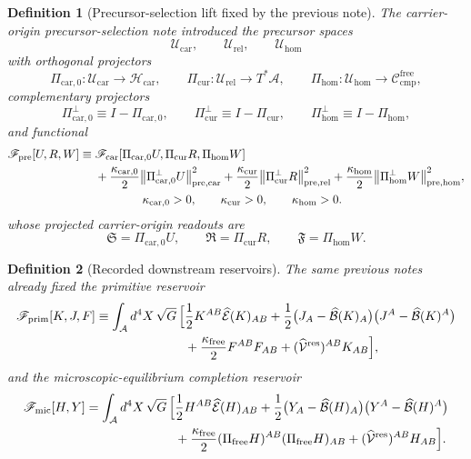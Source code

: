 \documentclass[11pt]{article}
\newcommand{\Sub}{\mathcal A}
\newcommand{\ResidualLift}{\widehat{\mathcal V}^{\mathrm{res}}}
\newcommand{\SubEinLin}{\widehat{\mathcal E}}
\newcommand{\SubGaugeVec}{\widehat{\mathcal B}}
\newcommand{\FreeProj}{\Pi_{\mathrm{free}}}
\newcommand{\GaugeAux}{Y}
\newcommand{\CompFree}{\mathscr C_{\mathrm{cmp}}^{\mathrm{free}}}
\newcommand{\MicFunctional}{\mathscr F_{\mathrm{mic}}}
\newcommand{\PrimFunctional}{\mathscr F_{\mathrm{prim}}}
\newcommand{\CarrierFunctional}{\mathscr F_{\mathrm{car}}}
\newcommand{\PreFunctional}{\mathscr F_{\mathrm{pre}}}
\newcommand{\FreeStiff}{\kappa_{\mathrm{free}}}
\newcommand{\PrimStrain}{K}
\newcommand{\PrimNeutral}{J}
\newcommand{\PrimFree}{F}
\newcommand{\CarrierClass}{\mathscr H_{\mathrm{car}}}
\newcommand{\CarrierSeed}{\mathfrak S}
\newcommand{\RelabelSeed}{\mathfrak R}
\newcommand{\FreeSeed}{\mathfrak F}
\newcommand{\PreTensorClass}{\mathscr U_{\mathrm{car}}}
\newcommand{\PreRelabelClass}{\mathscr U_{\mathrm{rel}}}
\newcommand{\PreFreeClass}{\mathscr U_{\mathrm{hom}}}
\newcommand{\PreTensor}{U}
\newcommand{\PreRelabel}{R}
\newcommand{\PreFree}{W}
\newcommand{\PreCarProj}{\Pi_{\mathrm{car},0}}
\newcommand{\PreCarPerp}{\Pi_{\mathrm{car},0}^{\perp}}
\newcommand{\CurrentProj}{\Pi_{\mathrm{cur}}}
\newcommand{\CurrentPerp}{\Pi_{\mathrm{cur}}^{\perp}}
\newcommand{\FreeReadProj}{\Pi_{\mathrm{hom}}}
\newcommand{\FreeReadPerp}{\Pi_{\mathrm{hom}}^{\perp}}
\newcommand{\PreCarGap}{\kappa_{\mathrm{car},0}}
\newcommand{\CurrentGap}{\kappa_{\mathrm{cur}}}
\newcommand{\HomGap}{\kappa_{\mathrm{hom}}}
\newtheorem{definition}{Definition}
\begin{document}
\begin{definition}[Precursor-selection lift fixed by the previous note]
\label{def:precursor_target}
The carrier-origin precursor-selection note introduced the precursor spaces
\[
\PreTensorClass,\qquad
\PreRelabelClass,\qquad
\PreFreeClass
\]
with orthogonal projectors
\[
\PreCarProj:\PreTensorClass\to\CarrierClass,
\qquad
\CurrentProj:\PreRelabelClass\to T^*\Sub,
\qquad
\FreeReadProj:\PreFreeClass\to\CompFree,
\]
complementary projectors
\[
\PreCarPerp\equiv I-\PreCarProj,
\qquad
\CurrentPerp\equiv I-\CurrentProj,
\qquad
\FreeReadPerp\equiv I-\FreeReadProj,
\]
and functional
\begin{equation}
\begin{aligned}
\PreFunctional[\PreTensor,\PreRelabel,\PreFree]
\equiv\;
&\CarrierFunctional[\PreCarProj\PreTensor,\CurrentProj\PreRelabel,\FreeReadProj\PreFree]
\\
&+\frac{\PreCarGap}{2}\norm{\PreCarPerp\PreTensor}_{\mathrm{pre,car}}^2
+\frac{\CurrentGap}{2}\norm{\CurrentPerp\PreRelabel}_{\mathrm{pre,rel}}^2
+\frac{\HomGap}{2}\norm{\FreeReadPerp\PreFree}_{\mathrm{pre,hom}}^2,
\\
&\qquad\qquad
\PreCarGap>0,\qquad
\CurrentGap>0,\qquad
\HomGap>0.
\end{aligned}
\label{eq:Fpre}
\end{equation}
whose projected carrier-origin readouts are
\begin{equation}
\CarrierSeed=\PreCarProj\PreTensor,
\qquad
\RelabelSeed=\CurrentProj\PreRelabel,
\qquad
\FreeSeed=\FreeReadProj\PreFree.
\label{eq:pre_readout}
\end{equation}
\end{definition}

\begin{definition}[Recorded downstream reservoirs]
\label{def:downstream}
The same previous notes already fixed the primitive reservoir
\begin{equation}
\begin{aligned}
\PrimFunctional[\PrimStrain,\PrimNeutral,\PrimFree]
\equiv
\int_{\Sub} d^4X\,\sqrt{G}\,
\Bigl[
&\frac12 \PrimStrain^{AB}\SubEinLin(\PrimStrain)_{AB}
+\frac12\bigl(\PrimNeutral_A-\SubGaugeVec(\PrimStrain)_A\bigr)
\bigl(\PrimNeutral^A-\SubGaugeVec(\PrimStrain)^A\bigr)
\\
&+\frac{\FreeStiff}{2}\PrimFree^{AB}\PrimFree_{AB}
+(\ResidualLift)^{AB}\PrimStrain_{AB}
\Bigr],
\end{aligned}
\label{eq:primitive}
\end{equation}
and the microscopic-equilibrium completion reservoir
\begin{equation}
\begin{aligned}
\MicFunctional[H,\GaugeAux]
=
\int_{\Sub} d^4X\,\sqrt{G}\,
\Bigl[
&\frac12 H^{AB}\SubEinLin(H)_{AB}
+\frac12\bigl(\GaugeAux_A-\SubGaugeVec(H)_A\bigr)
\bigl(\GaugeAux^A-\SubGaugeVec(H)^A\bigr)
\\
&+\frac{\FreeStiff}{2}(\FreeProj H)^{AB}(\FreeProj H)_{AB}
+(\ResidualLift)^{AB}H_{AB}
\Bigr].
\end{aligned}
\label{eq:mic}
\end{equation}
\end{definition}
\end{document}
